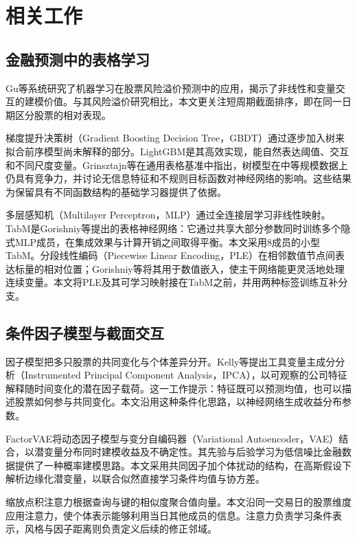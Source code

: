 \documentclass[UTF8,11pt,a4paper,fontset=fandol]{ctexart}
\begin{document}
\section{相关工作}
\subsection{金融预测中的表格学习}
Gu等\cite{gu2020}系统研究了机器学习在股票风险溢价预测中的应用，揭示了非线性和变量交互的建模价值。与其风险溢价研究相比，本文更关注短周期截面排序，即在同一日期区分股票的相对表现。

梯度提升决策树（Gradient Boosting Decision Tree，GBDT）通过逐步加入树来拟合前序模型尚未解释的部分。LightGBM是其高效实现\cite{ke2017}，能自然表达阈值、交互和不同尺度变量。Grinsztajn等\cite{grinsztajn2022}在通用表格基准中指出，树模型在中等规模数据上仍具有竞争力，并讨论无信息特征和不规则目标函数对神经网络的影响。这些结果为保留具有不同函数结构的基础学习器提供了依据。

多层感知机（Multilayer Perceptron，MLP）通过全连接层学习非线性映射。TabM是Gorishniy等\cite{gorishniy2025}提出的表格神经网络：它通过共享大部分参数同时训练多个隐式MLP成员，在集成效果与计算开销之间取得平衡。本文采用8成员的小型TabM。分段线性编码（Piecewise Linear Encoding，PLE）在相邻数值节点间表达标量的相对位置；Gorishniy等\cite{gorishniy2022}将其用于数值嵌入，使主干网络能更灵活地处理连续变量。本文将PLE及其可学习映射接在TabM之前，并用两种标签训练互补分支。

\subsection{条件因子模型与截面交互}
因子模型把多只股票的共同变化与个体差异分开。Kelly等\cite{kelly2019}提出工具变量主成分分析（Instrumented Principal Component Analysis，IPCA），以可观察的公司特征解释随时间变化的潜在因子载荷。这一工作提示：特征既可以预测均值，也可以描述股票如何参与共同变化。本文沿用这种条件化思路，以神经网络生成收益分布参数。

FactorVAE\cite{duan2022}将动态因子模型与变分自编码器（Variational Autoencoder，VAE）结合，以潜变量分布同时建模收益及不确定性。其先验与后验学习为低信噪比金融数据提供了一种概率建模思路。本文采用共同因子加个体扰动的结构，在高斯假设下解析边缘化潜变量，以联合似然直接学习条件均值与协方差。

缩放点积注意力\cite{vaswani2017}根据查询与键的相似度聚合值向量。本文沿同一交易日的股票维度应用注意力，使个体表示能够利用当日其他成员的信息。注意力负责学习条件表示，风格与因子距离则负责定义后续的修正邻域。
\end{document}
